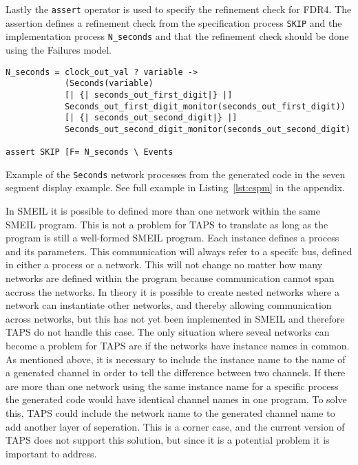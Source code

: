 Lastly the \cspm{} \texttt{assert} operator is used to specify the refinement check for FDR4. The assertion defines a refinement check from the specification process \texttt{SKIP} and the implementation process \texttt{N\_seconds} and that the refinement check should be done using the Failures model.\\
\begin{listing}
\begin{verbatim}
N_seconds = clock_out_val ? variable ->
            (Seconds(variable)
            [| {| seconds_out_first_digit|} |]
            Seconds_out_first_digit_monitor(seconds_out_first_digit))
            [| {| seconds_out_second_digit|} |]
            Seconds_out_second_digit_monitor(seconds_out_second_digit)

assert SKIP [F= N_seconds \ Events
\end{verbatim}
\caption{Example of the \texttt{Seconds} network processes from the generated \cspm{} code in the seven segment display example. See full example in Listing~\ref{lst:cspm} in the appendix.}
\label{lst:network_example_cspm}
\end{listing}

In SMEIL it is possible to defined more than one network within the same SMEIL program. This is not a problem for TAPS to translate as long as the program is still a well-formed SMEIL program. Each instance defines a process and its parameters. This communication will always refer to a specifc bus, defined in either a process or a network. This will not change no matter how many networks are defined within the program because communication cannot span accross the networks.
In theory it is possible to create nested networks where a network can instantiate other networks, and thereby allowing communication across networks, but this has not yet been implemented in SMEIL and therefore TAPS do not handle this case.
The only situation where seveal networks can become a problem for TAPS are if the networks have instance names in common. As mentioned above, it is necessary to include the instance name to the name of a generated \cspm{} channel in order to tell the difference between two \cspm{} channels. If there are more than one network using the same instance name for a specific process the generated code would have identical channel names in one \cspm{} program. To solve this, TAPS could include the network name to the generated \cspm{} channel name to add another layer of seperation. This is a corner case, and the current version of TAPS does not support this solution, but since it is a potential problem it is important to address.

